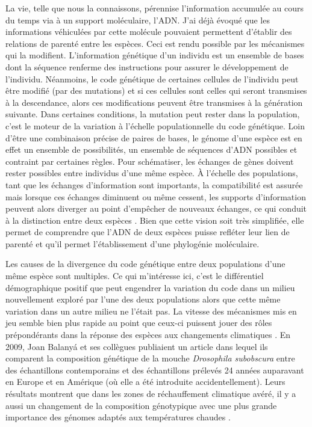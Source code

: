 La vie, telle que nous la connaissons, pérennise l'information accumulée
au cours du temps via à un support moléculaire, l'ADN. J'ai déjà évoqué
que les informations véhiculées par cette molécule pouvaient permettent
d'établir des relations de parenté entre les espèces. Ceci est rendu
possible par les mécanismes qui la modifient. L'information génétique
d'un individu est un ensemble de bases dont la séquence renferme des
instructions pour assurer le développement de l'individu. Néanmoins, le
code génétique de certaines cellules de l'individu peut être modifié
(par des mutations) et si ces cellules sont celles qui seront transmises
à la descendance, alors ces modifications peuvent être transmises à la
génération suivante. Dans certaines conditions, la mutation peut rester
dans la population, c'est le moteur de la variation à l'échelle
populationnelle du code génétique. Loin d'être une combinaison précise
de paires de bases, le génome d'une espèce est en effet un ensemble de
possibilités, un ensemble de séquences d'ADN possibles et contraint par
certaines règles. Pour schématiser, les échanges de gènes doivent rester
possibles entre individus d'une même espèce. À l'échelle des
populations, tant que les échanges d'information sont importants, la
compatibilité est assurée mais lorsque ces échanges diminuent ou même
cessent, les supports d'information peuvent alors diverger au point
d'empêcher de nouveaux échanges, ce qui conduit à la distinction entre
deux espèces \citep{Coyne2004}. Bien que cette vision soit très
simplifiée, elle permet de comprendre que l'ADN de deux espèces puisse
refléter leur lien de parenté et qu'il permet l'établissement d'une
phylogénie moléculaire.

Les causes de la divergence du code génétique entre deux populations
d'une même espèce sont multiples. Ce qui m'intéresse ici, c'est le
différentiel démographique positif que peut engendrer la variation du
code dans un milieu nouvellement exploré par l'une des deux populations
alors que cette même variation dans un autre milieu ne l'était pas. La
vitesse des mécanismes mis en jeu semble bien plus rapide au point que
ceux-ci puissent jouer des rôles prépondérants dans la réponse des
espèces aux changements climatiques \citep{Lavergne2010}. En 2009, Joan
Balanyá et ses collègues publiaient un article dans lequel ils comparent
la composition génétique de la mouche \emph{Drosophila subobscura} entre
des échantillons contemporains et des échantillons prélevés 24 années
auparavant en Europe et en Amérique (où elle a été introduite
accidentellement). Leurs résultats montrent que dans les zones de
réchauffement climatique avéré, il y a aussi un changement de la
composition génotypique avec une plus grande importance des génomes
adaptés aux températures chaudes \citep{Balanya2006}.

